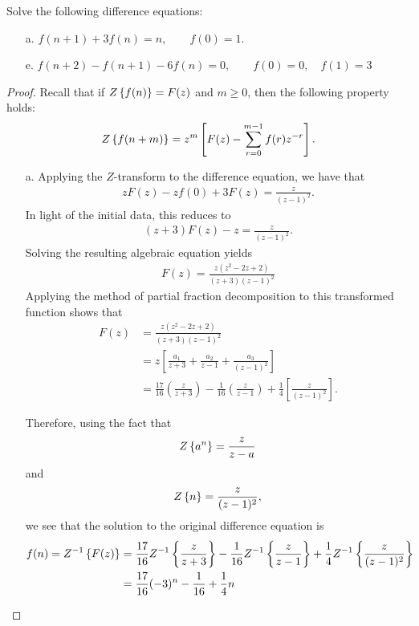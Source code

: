 \begin{problem}{12.7}
  Solve the following difference equations:
  \begin{enumerate}
    \item[a.] $f(n+1)+3f(n)=n, \qquad f(0) = 1.$
    \item[e.] $f(n+2)-f(n+1)-6f(n)=0, \qquad f(0) = 0,\quad f(1)=3$
  \end{enumerate}
\end{problem}

\begin{proof}
  Recall that if $Z\left\{ {f(n)} \right\} = F(z)$ and $m \geq 0$, then the following property holds:
  \begin{align*}
    Z\left\{ {f(n+m)} \right\} = z^m \left[F(z) - \sum_{r=0}^{m-1}f(r) z^{-r}\right].
  \end{align*}

  \begin{enumerate}
    \item[a.] Applying the $Z$-transform to the difference equation, we have that
      \begin{align*}
        z F(z) -z f(0) + 3 F(z) = \frac{z}{(z-1)^2}.
      \end{align*}
      In light of the initial data, this reduces to
      \begin{align*}
        (z+3)F(z) - z = \frac{z}{(z-1)^2}.
      \end{align*}
      Solving the resulting algebraic equation yields
      \begin{align*}
        F(z) = \frac{z (z^2 -2z + 2)}{(z+3)(z-1)^2}
      \end{align*}
      Applying the method of partial fraction decomposition to this transformed function
      shows that
      \begin{align*}
        F(z)
        &= \frac{z (z^2 -2z + 2)}{(z+3)(z-1)^2} \\
        &= z\left[\frac{a_1}{z+3} + \frac{a_2}{z-1} + \frac{a_3}{(z-1)^2}\right] \\
        &= \frac{17}{16}\left(\frac{z}{z+3}\right) - \frac{1}{16}\left(\frac{z}{z-1}\right) + \frac{1}{4}\left[\frac{z}{(z-1)^2}\right].
      \end{align*}

      Therefore, using the fact that
      \begin{align*}
        Z\left\{ {a^n} \right\} = \frac{z}{z-a}
      \end{align*}
      and
      \begin{align*}
        Z\left\{ {n} \right\} = \frac{z}{(z-1)^2},
      \end{align*}
      we see that the solution to the original difference equation is
      \begin{align*}
        f(n) = Z^{-1}\left\{ {F(z)} \right\}
        &= \frac{17}{16}Z^{-1}\left\{ {\frac{z}{z+3}} \right\} - \frac{1}{16}Z^{-1}\left\{ {\frac{z}{z-1}} \right\} + \frac{1}{4}Z^{-1}\left\{ {\frac{z}{(z-1)^2}} \right\} \\
        &= \frac{17}{16}(-3)^n - \frac{1}{16} + \frac{1}{4}n \\
      \end{align*}


\end{enumerate}
\end{proof}
